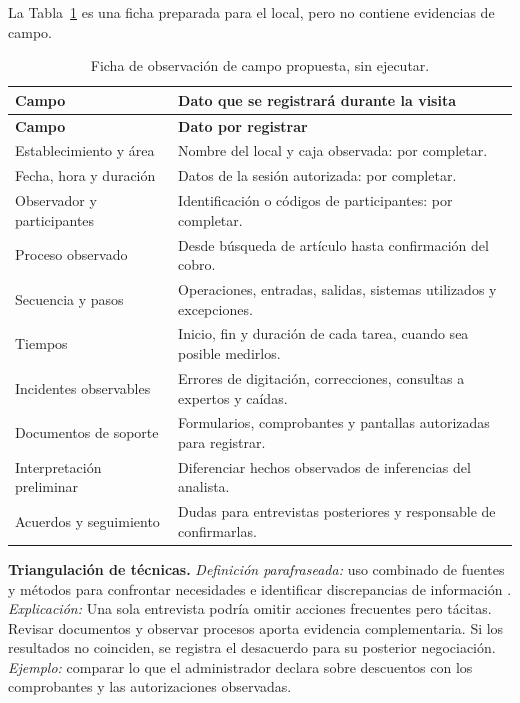 \documentclass[onecolumn,12pt,a4paper]{IEEEtran}
\begin{document}
La Tabla~\ref{tab:observacion} es una ficha preparada para el local, pero no contiene evidencias de campo.
\small
\begin{longtable}{@{}p{5.0cm}p{10.0cm}@{}}
\caption{Ficha de observación de campo propuesta, sin ejecutar.}\label{tab:observacion}\\
\toprule\textbf{Campo} & \textbf{Dato que se registrará durante la visita}\\\midrule\endfirsthead
\toprule\textbf{Campo} & \textbf{Dato por registrar}\\\midrule\endhead
Establecimiento y área & Nombre del local y caja observada: por completar.\\
Fecha, hora y duración & Datos de la sesión autorizada: por completar.\\
Observador y participantes & Identificación o códigos de participantes: por completar.\\
Proceso observado & Desde búsqueda de artículo hasta confirmación del cobro.\\
Secuencia y pasos & Operaciones, entradas, salidas, sistemas utilizados y excepciones.\\
Tiempos & Inicio, fin y duración de cada tarea, cuando sea posible medirlos.\\
Incidentes observables & Errores de digitación, correcciones, consultas a expertos y caídas.\\
Documentos de soporte & Formularios, comprobantes y pantallas autorizadas para registrar.\\
Interpretación preliminar & Diferenciar hechos observados de inferencias del analista.\\
Acuerdos y seguimiento & Dudas para entrevistas posteriores y responsable de confirmarlas.\\
\bottomrule\end{longtable}
\normalsize

\textbf{Triangulación de técnicas.} \emph{Definición parafraseada:} uso combinado de fuentes y métodos para confrontar necesidades e identificar discrepancias de información \cite{pohl2025,ireb2023}. \emph{Explicación:} Una sola entrevista podría omitir acciones frecuentes pero tácitas. Revisar documentos y observar procesos aporta evidencia complementaria. Si los resultados no coinciden, se registra el desacuerdo para su posterior negociación. \emph{Ejemplo:} comparar lo que el administrador declara sobre descuentos con los comprobantes y las autorizaciones observadas.
\end{document}
